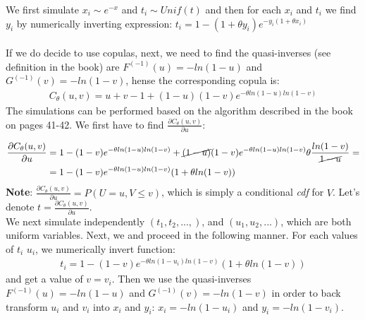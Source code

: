 \documentclass[]{article}
\begin{document}
 We first simulate $x_i \sim e^{-x}$ and $t_i \sim Unif(t)$ and then for each $x_i$ and $t_i$ we find $y_i$ by numerically inverting expression: $t_i = 1 - (1+\theta y_i)e^{-y_i(1+\theta x_i)}$ \\
~\\
If we do decide to use copulas, next, we need to find the quasi-inverses (see definition in the book) are $F^{(-1)}(u) = -ln (1-u)$ and $G^{(-1)}(v) = -ln (1-v)$, hense the corresponding copula is:
  $$
  \begin{aligned}
      C_{\theta}(u, v) = u+v-1+(1-u)(1-v)e^{-\theta ln(1-u) ln(1-v)}
  \end{aligned}
  $$
The simulations can be performed based on the algorithm described in the book on pages 41-42. We first have to find $\frac{\partial C_{\theta}(u, v)}{\partial u}$:

  $$
  \begin{aligned}
     \frac{\partial C_{\theta}(u, v)}{\partial u} &= 1-(1-v)e^{-\theta ln(1-u) ln(1-v)} + \cancel{(1-u)}(1-v)e^{-\theta ln(1-u) ln(1-v)} \theta \frac{ln(1-v)}{\cancel{1-u}} =\\
     &= 1 - (1-v)e^{-\theta ln(1-u) ln(1-v)}(1 + \theta ln(1-v))
  \end{aligned}
  $$
\textbf{Note}: $\frac{\partial C_{\theta}(u, v)}{\partial u} = P(U= u, V\leq v)$, which is simply a conditional \emph{cdf} for $V$. Let's denote $t=\frac{\partial C_{\theta}(u, v)}{\partial u}$.\\
We next simulate independently $(t_1, t_2, ..., )$, and $(u_1, u_2, ...)$, which are both uniform variables. Next, we and proceed in the following manner. For each values of $t_i$  $u_i$, we numerically invert function:
  $$
  \begin{aligned}
      t_i = 1 - (1-v)e^{-\theta ln(1-u_i) ln(1-v)}(1 + \theta ln(1-v))
  \end{aligned}
  $$
and get a value of $v=v_i$. Then we use the quasi-inverses $F^{(-1)}(u) = -ln (1-u)$ and $G^{(-1)}(v) = -ln (1-v)$ in order to back transform $u_i$ and $v_i$ into $x_i$ and $y_i$: $x_i = -ln (1-u_i)$ and $y_i = -ln (1-v_i)$.
\end{document}
